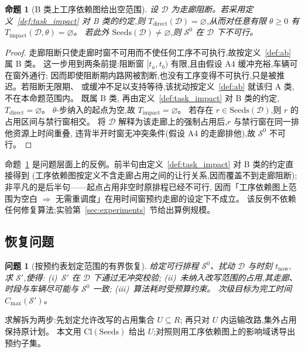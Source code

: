 \documentclass[manuscript,screen,review]{acmart}
\newtheorem{problem}{问题}
\newtheorem{prop}{命题}
\begin{document}
\begin{prop}[B 类上工序依赖图给出空范围]
\label{prop:miss}
设 \(\mathcal{D}\) 为走廊阻断。若采用定义~\ref{def:task_impact} 对 B 类的约定,则
\(T_{\mathrm{direct}}(\mathcal{D})=\varnothing\),从而对任意有限 \(\theta\ge 0\) 有
\(T_{\mathrm{impact}}(\mathcal{D},\theta)=\varnothing\)。
若此外 \(\mathrm{Seeds}(\mathcal{D})\neq\varnothing\),则 \(\mathcal{S}^0\) 在 \(\mathcal{D}\) 下不可行。
\end{prop}

\begin{proof}
走廊阻断只使走廊时窗不可用而不使任何工序不可执行,故按定义~\ref{def:ab} 属 B 类。
这一步用到两条前提:阻断窗 \([t_a,t_b)\) 有限,且由假设 A4 缓冲充裕,车辆可在窗外通行;
因而即使阻断期内路网被割断,也没有工序变得不可执行,只是被推迟。若阻断无限期、
或缓冲不足以支持等待,该扰动按定义~\ref{def:ab} 就该归 A 类,不在本命题范围内。
既属 B 类,
再由定义~\ref{def:task_impact} 对 B 类的约定,\(T_{\mathrm{direct}}=\varnothing\)。
\(\theta\)-步纳入的起点为空,故 \(T_{\mathrm{impact}}=\varnothing\)。
若存在 \(r\in\mathrm{Seeds}(\mathcal{D})\),则 \(r\) 的占用区间与禁行窗相交。
将 \(\mathcal{D}\) 解释为该走廊上的强制占用后,\(r\) 与禁行窗在同一排他资源上时间重叠,
违背半开时窗无冲突条件(假设 A4 的走廊排他),故 \(\mathcal{S}^0\) 不可行。
\end{proof}

命题~\ref{prop:miss} 是问题层面上的反例。前半句由定义~\ref{def:task_impact} 对 B 类的约定直接得到
(工序依赖图按定义不含走廊占用之间的让行关系,因而覆盖不到走廊阻断);
非平凡的是后半句——起点占用非空时原排程已经不可行,
因而「工序依赖图上范围为空白 \(\Rightarrow\) 无需重调度」在用时间窗预约走廊的设定下不成立。
该反例不依赖任何修复算法;实验第~\ref{sec:experiments}~节给出算例规模。

\subsection{恢复问题}
\label{sec:recovery_problem}

\begin{problem}[按预约表划定范围的有界恢复]
\label{prob:recovery}
给定可行排程 \(\mathcal{S}^0\)、扰动 \(\mathcal{D}\) 与时刻 \(t_{\mathrm{now}}\),
求 \(\mathcal{S}'\),使得:
(i)~\(\mathcal{S}'\) 在 \(\mathcal{D}\) 下通过无冲突校验;
(ii)~未纳入改写范围的占用,其走廊、时段与车辆尽可能与 \(\mathcal{S}^0\) 一致;
(iii)~算法耗时受预算约束。
次级目标为完工时间 \(C_{\max}(\mathcal{S}')\)。
\end{problem}

求解拆为两步:先划定允许改写的占用集合 \(U\subseteq R\);
再只对 \(U\) 内运输改路,集外占用保持原计划。
本文用 \(\mathrm{Cl}(\mathrm{Seeds})\) 给出 \(U\);对照则用工序依赖图上的影响域诱导出预约子集。
\end{document}
